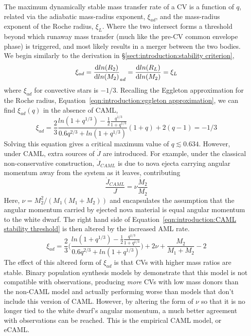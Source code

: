 The maximum dynamically stable mass transfer rate of a CV is a function of $q$, related via the adiabatic mass-radius exponent, $\xi_{ad}$, and the mass-radius exponent of the Roche radius, $\xi_{L}$. Where the two intersect forms a threshold beyond which runaway mass transfer (much like the pre-CV common envelope phase) is triggered, and most likely results in a merger between the two bodies. We begin similarly to the derivation in \S\ref{sect:introduction:stability criterion},
\begin{equation}
    \label{eqn:introduction:CAML stability threshold}
    \xi_{ad} = \frac{{\rm d} ln(R_2)}{{\rm d} ln(M_2)}_{ad} = \frac{{\rm d} ln(R_L)}{{\rm d} ln(M_2)} = \xi_L
\end{equation}
where $\xi_{ad}$ for convective stars is $-1/3$. Recalling the Eggleton approximation for the Roche radius, Equation~\ref{eqn:introduction:eggleton approximation}, we can find $\xi_{ad}(q)$ \citep{Schreiber2016} in the absence of CAML,
\begin{equation}
    \xi_{ad} = \frac{2}{3}\frac{ln(1+q^{1/3}) - \frac{1}{2}\frac{q^{1/3}}{1+q^{1/3}}}{0.6q^{2/3} + ln(1+q^{1/3})} (1 + q) + 2(q - 1) = -1/3
\end{equation}
Solving this equation gives a critical maximum value of $q \lesssim 0.634$. However, under CAML, extra sources of $\dot J$ are introduced. For example, under the classical non-conservative construction, $\dot J_{CAML}$ is due to nova ejecta carrying angular momentum away from the system as it leaves, contributing
\begin{equation}
    \frac{\dot J_{CAML}}{J} = \nu \frac{\dot M_2}{M_2}
\end{equation}
Here, $\nu = M_2^2 / (M_1(M_1 + M_2))$ and encapsulates the assumption that the angular momentum carried by ejected nova material is equal angular momentum to the white dwarf.
The right hand side of Equation~\ref{eqn:introduction:CAML stability threshold} is then altered by the increased AML rate.
\begin{equation}
    \xi_{ad} = \frac{2}{3} \Bigg( \frac{ln(1+q^{1/3}) - \frac{1}{2}\frac{q^{1/3}}{1+q^{1/3}}}{0.6q^{2/3} + ln(1+q^{1/3})} \Bigg) + 2\nu + \frac{M_2}{M_1 + M_2} - 2
\end{equation}
The effect of this altered form of $\xi_{ad}$ is that CVs with higher mass ratios are stable. Binary population synthesis models by \citet{Schreiber2016} demonstrate that this model is not compatible with observations, producing {\it more} CVs with low mass donors than the non-CAML model and actually performing worse than models that don't include this version of CAML. However, by altering the form of $\nu$ so that it is no longer tied to the white dwarf's angular momentum, a much better agreement with observations can be reached. This is the empirical CAML model, or eCAML.

